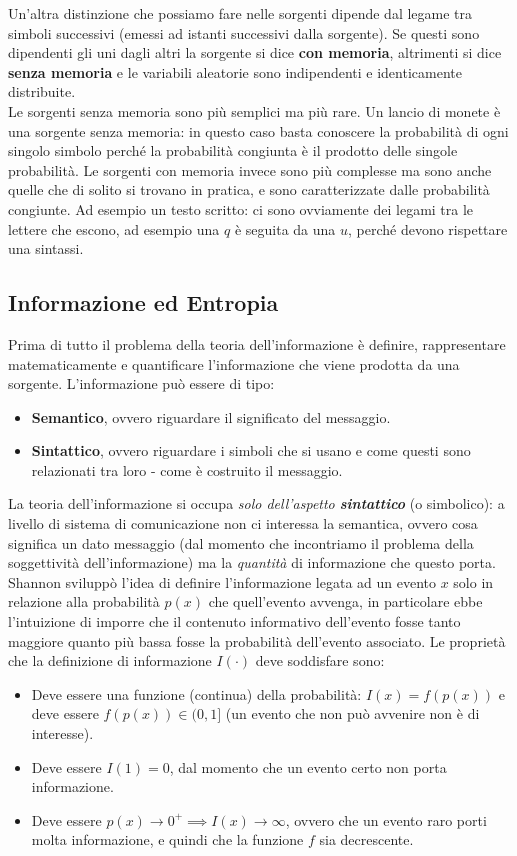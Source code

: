 Un'altra distinzione che possiamo fare nelle sorgenti dipende dal legame tra simboli successivi (emessi ad istanti successivi dalla sorgente). Se questi sono dipendenti gli uni dagli altri la sorgente si dice \textbf{con memoria}, altrimenti si dice \textbf{senza memoria} e le variabili aleatorie sono indipendenti e identicamente distribuite. \\
Le sorgenti senza memoria sono più semplici ma più rare. Un lancio di monete è una sorgente senza memoria: in questo caso basta conoscere la probabilità di ogni singolo simbolo perché la probabilità congiunta è il prodotto delle singole probabilità. Le sorgenti con memoria invece sono più complesse ma sono anche quelle che di solito si trovano in pratica, e sono caratterizzate dalle probabilità congiunte. Ad esempio un testo scritto: ci sono ovviamente dei legami tra le lettere che escono, ad esempio una $q$ è seguita da una $u$, perché devono rispettare una sintassi. 
\subsection{Informazione ed Entropia}
Prima di tutto il problema della teoria dell’informazione è definire, rappresentare matematicamente e
quantificare l’informazione che viene prodotta da una sorgente. L’informazione può essere di tipo:
\begin{itemize}
    \item \textbf{Semantico}, ovvero riguardare il significato del messaggio.
    \item \textbf{Sintattico}, ovvero riguardare i simboli che si usano e come questi sono relazionati tra loro - come \`e costruito il messaggio.
\end{itemize}
La teoria dell’informazione si occupa \textit{solo dell’aspetto \textbf{sintattico}} (o simbolico): a livello di sistema di comunicazione non ci interessa la semantica, ovvero cosa significa un dato messaggio (dal momento che incontriamo il problema della soggettività dell’informazione) ma la \textit{quantità} di informazione che questo porta.\\ 
Shannon sviluppò l’idea di definire l’informazione legata ad un evento $x$ solo in relazione
alla probabilità $p(x)$ che quell’evento avvenga, in particolare ebbe l'intuizione di imporre che il contenuto informativo dell'evento fosse tanto maggiore quanto pi\`u bassa fosse la probabilit\`a dell'evento associato. Le propriet\`a che la definizione di informazione $I(\cdot)$ deve soddisfare sono:
\begin{itemize}
    \item Deve essere una funzione (continua) della probabilit\`a: $I(x) = f(p(x))$ e deve essere $f(p(x)) \in (0,1]$ (un evento che non pu\`o avvenire non \`e di interesse). 
    \item Deve essere $I(1) = 0$, dal momento che un evento certo non porta informazione.
    \item Deve essere $p(x) \to 0^+ \implies I(x) \to \infty$, ovvero che un evento raro porti molta informazione, e quindi che la funzione $f$ sia decrescente.
\end{itemize}

